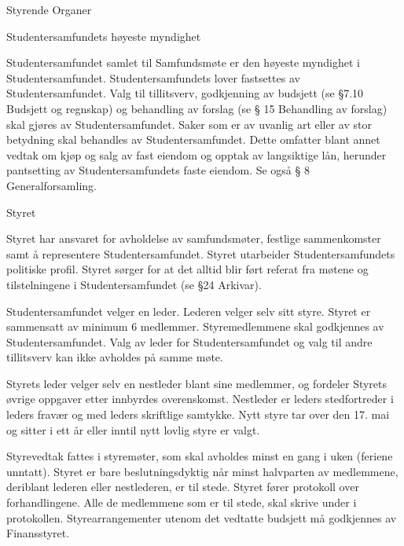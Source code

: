 \documentclass[fsbok.tex]{subfiles}
\begin{document}
\begin{lovkapittel}{Styrende Organer}

  \begin{lovparagraf}{Studentersamfundets høyeste myndighet}
    
Studentersamfundet samlet til Samfundsmøte er den høyeste myndighet i Studentersamfundet. Studentersamfundets
lover fastsettes av Studentersamfundet. Valg til tillitsverv, godkjenning av budsjett (se §7.10 Budsjett og regnskap) og
behandling av forslag (se § 15 Behandling av forslag) skal gjøres av Studentersamfundet. Saker som er av uvanlig art
eller av stor betydning skal behandles av Studentersamfundet. Dette omfatter blant annet vedtak om kjøp og salg av
fast eiendom og opptak av langsiktige lån, herunder pantsetting av Studentersamfundets faste eiendom.
Se også § 8 Generalforsamling.

  \end{lovparagraf}
  
  \begin{lovparagraf}{Styret}
  
Styret har ansvaret for avholdelse av samfundsmøter, festlige sammenkomster samt å representere
Studentersamfundet. Styret utarbeider Studentersamfundets politiske profil. Styret sørger for at det alltid blir ført
referat fra møtene og tilstelningene i Studentersamfundet (se §24 Arkivar).

Studentersamfundet velger en leder. Lederen velger selv sitt styre. Styret er sammensatt av minimum 6 medlemmer.
Styremedlemmene skal godkjennes av Studentersamfundet. Valg av leder for Studentersamfundet og valg til andre
tillitsverv kan ikke avholdes på samme møte.

Styrets leder velger selv en nestleder blant sine medlemmer, og fordeler Styrets øvrige oppgaver etter innbyrdes
overenskomst. Nestleder er leders stedfortreder i leders fravær og med leders skriftlige samtykke. Nytt styre tar over
den 17. mai og sitter i ett år eller inntil nytt lovlig styre er valgt.

Styrevedtak fattes i styremøter, som skal avholdes minst en gang i uken (feriene unntatt). Styret er bare
beslutningsdyktig når minst halvparten av medlemmene, deriblant lederen eller nestlederen, er til stede. Styret fører
protokoll over forhandlingene. Alle de medlemmene som er til stede, skal skrive under i protokollen.
Styrearrangementer utenom det vedtatte budsjett må godkjennes av Finansstyret.

  \end{lovparagraf}


\end{lovkapittel}
\end{document}
